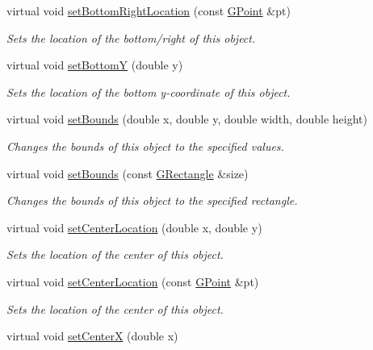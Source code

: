 \begin{DoxyCompactItemize}
virtual void \mbox{\hyperlink{classGObject_ac6f7320321182f1d18c1c0fa97d5e941}{set\+Bottom\+Right\+Location}} (const \mbox{\hyperlink{classGPoint}{G\+Point}} \&pt)
\begin{DoxyCompactList}\small\item\em Sets the location of the bottom/right of this object. \end{DoxyCompactList}\item 
virtual void \mbox{\hyperlink{classGObject_a4b20e93c2a2597484f74ee5caa71f41f}{set\+BottomY}} (double y)
\begin{DoxyCompactList}\small\item\em Sets the location of the bottom y-\/coordinate of this object. \end{DoxyCompactList}\item 
virtual void \mbox{\hyperlink{classGObject_a2aae8197624b72265ab83b4f1bc73f2f}{set\+Bounds}} (double x, double y, double width, double height)
\begin{DoxyCompactList}\small\item\em Changes the bounds of this object to the specified values. \end{DoxyCompactList}\item 
virtual void \mbox{\hyperlink{classGObject_acada386653f008cacc7cce86426bef7c}{set\+Bounds}} (const \mbox{\hyperlink{classGRectangle}{G\+Rectangle}} \&size)
\begin{DoxyCompactList}\small\item\em Changes the bounds of this object to the specified rectangle. \end{DoxyCompactList}\item 
virtual void \mbox{\hyperlink{classGObject_a290b47dd8de1be44089f95cb2c47c1de}{set\+Center\+Location}} (double x, double y)
\begin{DoxyCompactList}\small\item\em Sets the location of the center of this object. \end{DoxyCompactList}\item 
virtual void \mbox{\hyperlink{classGObject_a1bedf1b233ecba3f753ec58908a683a6}{set\+Center\+Location}} (const \mbox{\hyperlink{classGPoint}{G\+Point}} \&pt)
\begin{DoxyCompactList}\small\item\em Sets the location of the center of this object. \end{DoxyCompactList}\item 
virtual void \mbox{\hyperlink{classGObject_a2f4936281e056eead00a9186b9ba8af6}{set\+CenterX}} (double x)

\end{DoxyCompactItemize}
